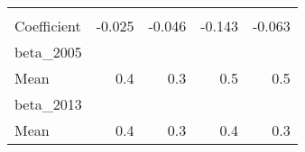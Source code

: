 \begin{tabular}{lllll}
  \multicolumn{1}{r}{} \\
\multicolumn{1}{l}{\hspace{1em}Coefficient} &
  \multicolumn{1}{|r}{-0.025} &
  \multicolumn{1}{r}{-0.046} &
  \multicolumn{1}{r}{-0.143} &
  \multicolumn{1}{r}{-0.063} \\
\multicolumn{1}{l}{beta\_2005} &
  \multicolumn{1}{|r}{} &
  \multicolumn{1}{r}{} &
  \multicolumn{1}{r}{} &
  \multicolumn{1}{r}{} \\
\multicolumn{1}{l}{\hspace{1em}Mean} &
  \multicolumn{1}{|r}{0.4} &
  \multicolumn{1}{r}{0.3} &
  \multicolumn{1}{r}{0.5} &
  \multicolumn{1}{r}{0.5} \\
\multicolumn{1}{l}{beta\_2013} &
  \multicolumn{1}{|r}{} &
  \multicolumn{1}{r}{} &
  \multicolumn{1}{r}{} &
  \multicolumn{1}{r}{} \\
\multicolumn{1}{l}{\hspace{1em}Mean} &
  \multicolumn{1}{|r}{0.4} &
  \multicolumn{1}{r}{0.3} &
  \multicolumn{1}{r}{0.4} &
  \multicolumn{1}{r}{0.3} \\
\cline{1-5}
\end{tabular}

